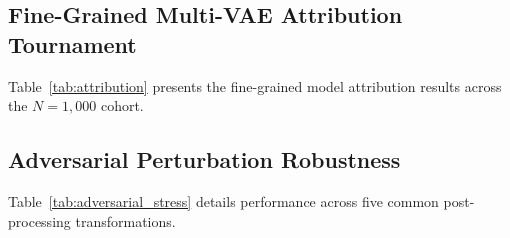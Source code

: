 \documentclass[conference]{IEEEtran}
\begin{document}
\subsection{Fine-Grained Multi-VAE Attribution Tournament}
Table~\ref{tab:attribution} presents the fine-grained model attribution results across the $N=1,000$ cohort.

\begin{table}[t]
\caption{Fine-Grained Latent Architecture Provenance Attribution ($N=1,000$).}
\label{tab:attribution}
\centering
\small
{}
\end{table}

\subsection{Adversarial Perturbation Robustness}
Table~\ref{tab:adversarial_stress} details performance across five common post-processing transformations.
\end{document}
